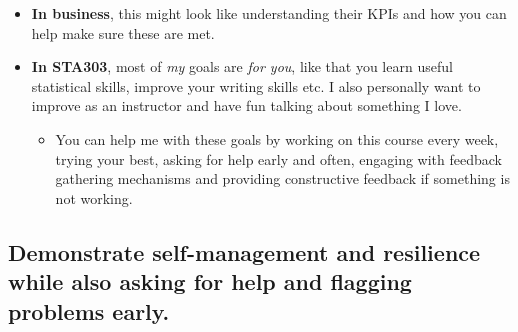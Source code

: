 \documentclass[
  openany]{book}
\providecommand{\tightlist}{%
  \setlength{\itemsep}{0pt}\setlength{\parskip}{0pt}}
\begin{document}
\begin{itemize}
\tightlist
\item
  \textbf{In business}, this might look like understanding their KPIs and how you can help make sure these are met.
\item
  \textbf{In STA303}, most of \emph{my} goals are \emph{for you}, like that you learn useful statistical skills, improve your writing skills etc. I also personally want to improve as an instructor and have fun talking about something I love.

  \begin{itemize}
  \tightlist
  \item
    You can help me with these goals by working on this course every week, trying your best, asking for help early and often, engaging with feedback gathering mechanisms and providing constructive feedback if something is not working.
  \end{itemize}
\end{itemize}

\hypertarget{demonstrate-self-management-and-resilience-while-also-asking-for-help-and-flagging-problems-early.}{%
\subsection{Demonstrate self-management and resilience while also asking for help and flagging problems early.}\label{demonstrate-self-management-and-resilience-while-also-asking-for-help-and-flagging-problems-early.}}
\end{document}
